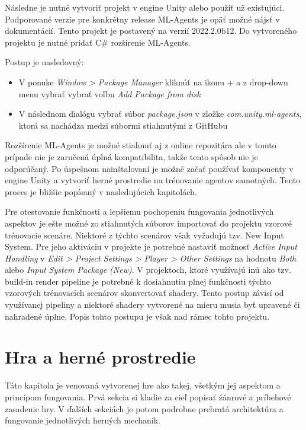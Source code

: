 \documentclass[slovak, master]{diploma}
\begin{document}
Následne je nutné vytvoriť projekt v engine Unity alebo použiť už existujúci. Podporované verzie pre konkrétny release ML-Agents je opäť možné nájsť v dokumentácií. Tento projekt je postavený na verzií 2022.2.0b12. Do vytvoreného projektu je nutné pridať C\# rozšírenie ML-Agents. 

Postup je nasledovný: 
\begin{itemize}
  \item V ponuke \textit{Window > Package Manager} kliknúť na ikonu + a z drop-down menu vybrať vybrať voľbu \textit{Add Package from disk}
  \item V následnom dialógu vybrať súbor \textit{package.json} v zložke \textit{com.unity.ml-agents}, ktorá sa nachádza medzi súbormi stiahnutými z GitHubu
\end{itemize}

Rozšírenie ML-Agents je možné stiahnuť aj z online repozitára ale v tomto prípade nie je zaručená úplná kompatibilita, takže tento spôsob nie je odporúčaný. Po úspešnom nainštalovaní je možné začať používať komponenty v engine Unity a vytvoriť herné prostredie na trénovanie agentov samotných. Tento proces je bližšie popísaný v nasledujúcich kapitolách. 

Pre otestovanie funkčnosti a lepšiemu pochopeniu fungovania jednotlivých aspektov je ešte možné zo stiahnutých súborov importovať do projektu vzorové trénovacie scenáre. Niektoré z týchto scenárov však vyžadujú tzv. New Input System. Pre jeho aktiváciu v projekte je potrebné nastaviť možnosť \textit{Active Input Handling} v \textit{Edit > Project Settings > Player > Other Settings} na hodnotu \textit{Both} alebo \textit{Input System Package (New)}. V projektoch, ktoré využívajú inú ako tzv. build-in render pipeline je potrebné k dosiahnutiu plnej funkčnosti týchto vzorových trénovacích scenárov skonvertovať shadery. Tento postup závisí od využívanej pipeliny a niektoré shadery vytvorené na mieru musia byť upravené či nahradené úplne. Popis tohto postupu je však nad rámec tohto projektu.

\chapter{Hra a herné prostredie}
\label{sec:GameOverview}
Táto kapitola je venovaná vytvorenej hre ako takej, všetkým jej aspektom a princípom fungovania. Prvá sekcia si kladie za cieľ popísať žánrové a príbehové zasadenie hry. V ďalších sekciách je potom podrobne prebratá architektúra a fungovanie jednotlivých herných mechaník.
\end{document}
